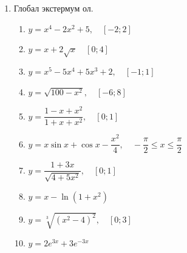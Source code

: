 \begin{enumerate}
\begin{enumerate}
        \item $y=x-\ln(1+x^2)$
        \item $y=\sqrt[3]{(x^2-4)^2}$
        \item $y=2e^{3x}+3e^{-3x}$
    \end{enumerate}
    \item Глобал экстермум ол.
    \begin{enumerate}
        \item $y=x^4-2x^2+5, \quad [-2;2]$
        \item $y=x+2\sqrt{x} \quad [0;4]$
        \item $y=x^5-5x^4+5x^3+2,\quad [-1;1]$
        \item $y=\sqrt{100-x^2}, \quad [-6;8]$
        \item $y=\dfrac{1-x+x^2}{1+x+x^2}, \quad [0;1]$
        \item $y=x\sin x+\cos x-\dfrac{x^2}{4}, \quad -\dfrac{\pi}{2}\leq x\leq \dfrac{\pi}{2}$
        \item $y=\dfrac{1+3x}{\sqrt{4+5x^2}}, \quad [0;1]$
        \item $y=x-\ln(1+x^2)$
        \item $y=\sqrt[3]{(x^2-4)^2}, \quad [0;3]$
        \item $y=2e^{3x}+3e^{-3x}$
    \end{enumerate}
\end{enumerate}
